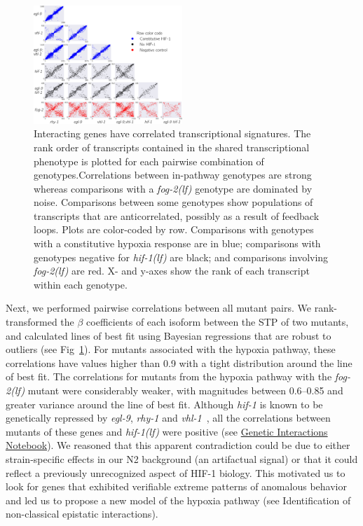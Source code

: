 \documentclass[9pt,twocolumn,twoside]{pnas-new}
\newcommand{\gene}[1]{\mbox{\emph{#1}}}
\newcommand{\fog}{\gene{fog-2(lf)}}
\newcommand{\hif}{\gene{hif-1(lf)}}
\newcommand{\hifp}{HIF-1}
\begin{document}
\begin{figure}[tbhp]
  \centering
  \includegraphics[width=0.5\textwidth]{../figs/triangle_plot.pdf}
  \caption{
  Interacting genes have correlated transcriptional signatures. The rank order
  of transcripts contained in the shared transcriptional phenotype is plotted
  for each pairwise combination of genotypes.Correlations between in-pathway
  genotypes are strong whereas comparisons with a \fog{} genotype are dominated
  by noise. Comparisons between some genotypes show populations of transcripts
  that are anticorrelated, possibly as a result of feedback loops. Plots are
  color-coded by row. Comparisons with genotypes with a constitutive hypoxia
  response are in blue; comparisons with genotypes negative for \hif{} are
  black; and comparisons involving \fog{} are red. X- and y-axes show the rank
  of each transcript within each genotype.
  }
\label{fig:genetic_interactions}
\end{figure}

Next, we performed pairwise correlations between all mutant pairs. We
rank-transformed the $\beta$ coefficients of each isoform between the STP of two
mutants, and calculated lines of best fit using Bayesian regressions that are
robust to outliers (see Fig~\ref{fig:genetic_interactions}). For mutants
associated with the hypoxia pathway, these correlations have values higher than
0.9 with a tight distribution around the line of best fit. The correlations for
mutants from the hypoxia pathway with the \fog{} mutant were considerably
weaker, with magnitudes between 0.6--0.85 and greater variance around the line
of best fit. Although \gene{hif-1} is known to be genetically repressed by
\gene{egl-9}, \gene{rhy-1} and \gene{vhl-1}~\cite{Epstein2001,Shen2006}, all the
correlations between mutants of these genes and \hif{} were positive (see
\href{https://wormlabcaltech.github.io/mprsq/analysis_notebooks/2_predict_interactions.html}
{Genetic Interactions Notebook}). We reasoned that this apparent contradiction
could be due to either strain-specific effects in our N2 background (an
artifactual signal) or that it could reflect a previously unrecognized aspect of
\hifp{} biology. This motivated us to look for genes that exhibited verifiable
extreme patterns of anomalous behavior and led us to propose a new model of the
hypoxia pathway (see Identification of non-classical epistatic interactions).
\end{document}
